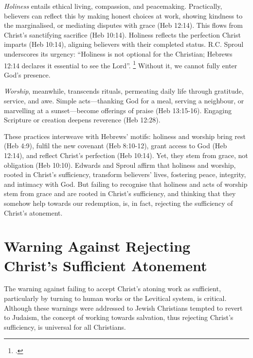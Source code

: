 \documentclass[12pt]{article}
\begin{document}
\emph{Holiness} entails ethical living, compassion, and peacemaking.
%
Practically, believers can reflect this by making honest choices at work,
showing kindness to the marginalised, or mediating disputes with grace (Heb
12:14).
%
This flows from Christ’s sanctifying sacrifice (Heb 10:14).
%
Holiness reflects the perfection Christ imparts (Heb 10:14), aligning believers
with their completed status.
%
R.C. Sproul underscores its urgency: ``Holiness is not optional for the
Christian; Hebrews 12:14 declares it essential to see the Lord''.
\footcite[112]{Sproul1985}
%
Without it, we cannot fully enter God’s presence.

\emph{Worship}, meanwhile, transcends rituals, permeating daily life through
gratitude, service, and awe.
%
Simple acts---thanking God for a meal, serving a neighbour, or marvelling at a
sunset---become offerings of praise (Heb 13:15-16).
%
Engaging Scripture or creation deepens reverence (Heb 12:28).

These practices interweave with Hebrews’ motifs: holiness and worship bring rest
(Heb 4:9), fulfil the new covenant (Heb 8:10-12), grant access to God
(Heb 12:14), and reflect Christ’s perfection (Heb 10:14). Yet, they stem
from grace, not obligation (Heb 10:10). Edwards and Sproul affirm that
holiness and worship, rooted in Christ’s sufficiency, transform believers’
lives, fostering peace, integrity, and intimacy with God. But failing to
recognise that holiness and acts of worship stem from grace and are rooted in
Christ’s sufficiency, and thinking that they somehow help towards our
redemption, is, in fact, rejecting the sufficiency of Christ's atonement.

\section{Warning Against Rejecting Christ’s Sufficient Atonement}
The warning against failing to accept Christ’s atoning work as sufficient,
particularly by turning to human works or the Levitical system, is critical.
%
Although these warnings were addressed to Jewish Christians tempted to revert to
Judaism, the concept of working towards salvation, thus rejecting Christ’s
sufficiency, is universal for all Christians.
\end{document}
